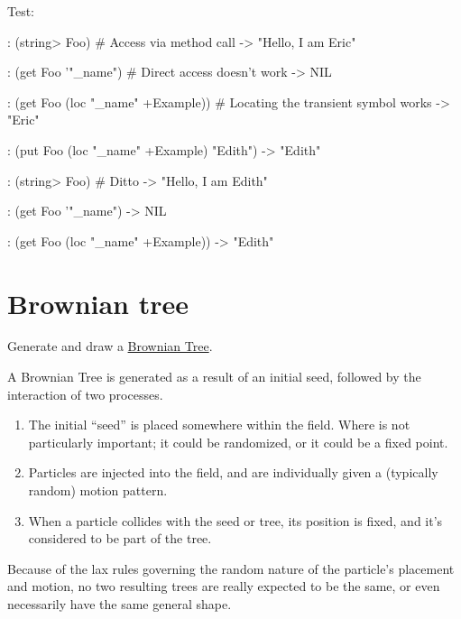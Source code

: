 \begin{wideverbatim}
Test:

: (string> Foo)                        # Access via method call
-> "Hello, I am Eric"

: (get Foo '"_name")                   # Direct access doesn't work
-> NIL

: (get Foo (loc "_name" +Example))     # Locating the transient symbol works
-> "Eric"

: (put Foo (loc "_name" +Example) "Edith")
-> "Edith"

: (string> Foo)                        # Ditto
-> "Hello, I am Edith"

: (get Foo '"_name")
-> NIL

: (get Foo (loc "_name" +Example))
-> "Edith"

\end{wideverbatim}

\pagebreak{}
\section*{Brownian tree}


Generate and draw a
\href{http://en.wikipedia.org/wiki/Brownian\_tree}{Brownian Tree}.

A Brownian Tree is generated as a result of an initial seed, followed by
the interaction of two processes.

\begin{enumerate}
\item
  The initial ``seed'' is placed somewhere within the field. Where is
  not particularly important; it could be randomized, or it could be a
  fixed point.
\item
  Particles are injected into the field, and are individually given a
  (typically random) motion pattern.
\item
  When a particle collides with the seed or tree, its position is fixed,
  and it's considered to be part of the tree.
\end{enumerate}

Because of the lax rules governing the random nature of the particle's
placement and motion, no two resulting trees are really expected to be
the same, or even necessarily have the same general shape.



